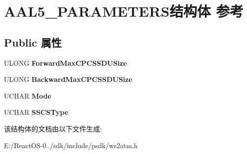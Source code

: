 \hypertarget{struct_a_a_l5___p_a_r_a_m_e_t_e_r_s}{}\section{A\+A\+L5\+\_\+\+P\+A\+R\+A\+M\+E\+T\+E\+R\+S结构体 参考}
\label{struct_a_a_l5___p_a_r_a_m_e_t_e_r_s}
\subsection*{Public 属性}
\begin{DoxyCompactItemize}
\item 
\mbox{\label{struct_a_a_l5___p_a_r_a_m_e_t_e_r_s_aac4e742cb745d251490cea243ce20001}} 
U\+L\+O\+NG {\bfseries Forward\+Max\+C\+P\+C\+S\+S\+D\+U\+Size}
\item 
\mbox{\label{struct_a_a_l5___p_a_r_a_m_e_t_e_r_s_a2a89fc88185383a56261fb328238d053}} 
U\+L\+O\+NG {\bfseries Backward\+Max\+C\+P\+C\+S\+S\+D\+U\+Size}
\item 
\mbox{\label{struct_a_a_l5___p_a_r_a_m_e_t_e_r_s_aa4bbd159433f2690f3b8da172a28091e}} 
U\+C\+H\+AR {\bfseries Mode}
\item 
\mbox{\label{struct_a_a_l5___p_a_r_a_m_e_t_e_r_s_a7120fb6ed6a5c8ab8c70859f64aaa0b4}} 
U\+C\+H\+AR {\bfseries S\+S\+C\+S\+Type}
\end{DoxyCompactItemize}


该结构体的文档由以下文件生成\+:\begin{DoxyCompactItemize}
\item 
E\+:/\+React\+O\+S-\/0../sdk/include/psdk/ws2atm.\+h\end{DoxyCompactItemize}
